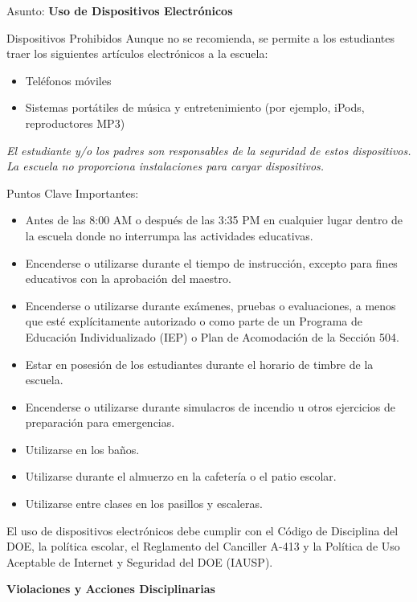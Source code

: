 \documentclass[letterpaper, 12pt]{article}
\begin{document}
Asunto: \textbf{Uso de Dispositivos Electrónicos}
\begin{redbox}[PS 192 | Política]
Dispositivos Prohibidos
Aunque no se recomienda, se permite a los estudiantes traer los siguientes artículos electrónicos a la escuela:
\begin{itemize}
\item Teléfonos móviles
\item Sistemas portátiles de música y entretenimiento (por ejemplo, iPods, reproductores MP3)
\end{itemize}
\textit{El estudiante y/o los padres son responsables de la seguridad de estos dispositivos. La escuela no proporciona instalaciones para cargar dispositivos.}
\vspace*{3mm}

Puntos Clave Importantes:
\begin{itemize}
\item Antes de las 8:00 AM o después de las 3:35 PM en cualquier lugar dentro de la escuela donde no interrumpa las actividades educativas.
\item Encenderse o utilizarse durante el tiempo de instrucción, excepto para fines educativos con la aprobación del maestro.
\item Encenderse o utilizarse durante exámenes, pruebas o evaluaciones, a menos que esté explícitamente autorizado o como parte de un Programa de Educación Individualizado (IEP) o Plan de Acomodación de la Sección 504.
\item Estar en posesión de los estudiantes durante el horario de timbre de la escuela.
\item Encenderse o utilizarse durante simulacros de incendio u otros ejercicios de preparación para emergencias.
\item Utilizarse en los baños.
\item Utilizarse durante el almuerzo en la cafetería o el patio escolar.
\item Utilizarse entre clases en los pasillos y escaleras.
\end{itemize}
\end{redbox}
El uso de dispositivos electrónicos debe cumplir con el Código de Disciplina del DOE, la política escolar, el Reglamento del Canciller A-413 y la Política de Uso Aceptable de Internet y Seguridad del DOE (IAUSP).

\pagebreak
\vspace*{-0.2cm}

\textbf{\textbf{Violaciones y Acciones Disciplinarias}}
\end{document}
